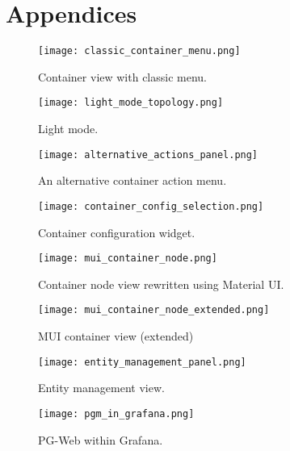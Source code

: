 \section{Appendices}



\begin{figure*}[b!]
    \centering
    \texttt{[image: classic\_container\_menu.png]}
    \caption{Container view with classic menu.}
\end{figure*}

\begin{figure*}[b!]
    \centering
    \texttt{[image: light\_mode\_topology.png]}
    \caption{Light mode.}
\end{figure*}

\begin{figure*}[b!]
    \centering
    \texttt{[image: alternative\_actions\_panel.png]}
    \caption{An alternative container action menu.}
\end{figure*}

\begin{figure*}[b!]
    \centering
    \texttt{[image: container\_config\_selection.png]}
    \caption{Container configuration widget.}
\end{figure*}

\begin{figure*}[b!]
    \centering
    \texttt{[image: mui\_container\_node.png]}
    \caption{Container node view rewritten using Material UI.}
\end{figure*}

\begin{figure*}[b!]
    \centering
    \texttt{[image: mui\_container\_node\_extended.png]}
    \caption{MUI container view (extended)}
\end{figure*}

\begin{figure*}[b!]
    \centering
    \texttt{[image: entity\_management\_panel.png]}
    \caption{Entity management view.}
\end{figure*}

\begin{figure*}[b!]
    \centering
    \texttt{[image: pgm\_in\_grafana.png]}
    \caption{PG-Web within Grafana.}
\end{figure*}